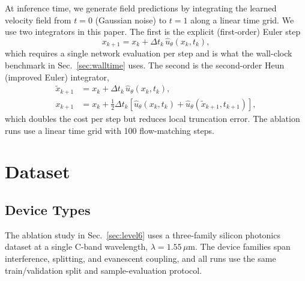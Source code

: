 \documentclass[%
 reprint,
 amsmath,amssymb,
 aps,
floatfix,
]{revtex4-2}
\begin{document}
At inference time, we generate field predictions by integrating the learned velocity field from $t = 0$ (Gaussian noise) to $t = 1$ along a linear time grid. We use two integrators in this paper. The first is the explicit (first-order) Euler step
\begin{equation}
    x_{k+1} = x_k + \Delta t_k\, \hat{u}_\theta(x_k, t_k),
    \label{eq:euler}
\end{equation}
which requires a single network evaluation per step and is what the wall-clock benchmark in Sec.~\ref{sec:walltime} uses. The second is the second-order Heun (improved Euler) integrator,
\begin{align}
    \tilde{x}_{k+1} &= x_k + \Delta t_k\, \hat{u}_\theta(x_k, t_k), \nonumber\\
    x_{k+1} &= x_k + \tfrac{1}{2}\Delta t_k\!\left[\hat{u}_\theta(x_k, t_k)
               + \hat{u}_\theta(\tilde{x}_{k+1}, t_{k+1})\right],
    \label{eq:heun}
\end{align}
which doubles the cost per step but reduces local truncation error. The ablation runs use a linear time grid with 100 flow-matching steps.


\section{\label{sec:level5}Dataset}

\subsection{Device Types}
The ablation study in Sec.~\ref{sec:level6} uses a three-family silicon photonics dataset at a single C-band wavelength, $\lambda=1.55\,\mu$m. The device families span interference, splitting, and evanescent coupling, and all runs use the same train/validation split and sample-evaluation protocol.
\end{document}
